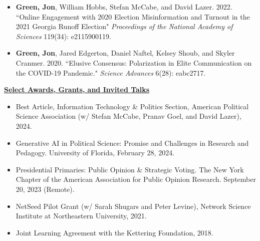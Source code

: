 \documentclass{article}
\begin{document}
\begin{itemize}
		\item \textbf{Green, Jon}, William Hobbs, Stefan McCabe, and David Lazer. 2022. ``Online Engagement with 2020 Election Misinformation and Turnout in the 2021 Georgia Runoff Election"  \textit{Proceedings of the National Academy of Sciences} 119(34): e2115900119.
		\item \textbf{Green, Jon}, Jared Edgerton, Daniel Naftel, Kelsey Shoub, and Skyler Cranmer. 2020. ``Elusive Consensus: Polarization in Elite Communication on the COVID-19 Pandemic." \textit{Science Advances} 6(28): eabc2717.
\end{itemize}

\noindent \textbf{\underline{Select Awards, Grants, and Invited Talks}}
	\begin{itemize}
		\item Best Article, Information Technology \& Politics Section, American Political Science Association (w/ Stefan McCabe, Pranav Goel, and David Lazer), 2024.
		\item Generative AI in Political Science: Promise and Challenges in Research and Pedagogy. University of Florida, February 28, 2024.
		\item Presidential Primaries: Public Opinion \& Strategic Voting. The New York Chapter of the American Association for Public Opinion Research. September 20, 2023 (Remote).
		\item NetSeed Pilot Grant (w/ Sarah Shugars and Peter Levine), Network Science Institute at Northeastern University, 2021.
		\item Joint Learning Agreement with the Kettering Foundation, 2018.
	\end{itemize}
\end{document}
